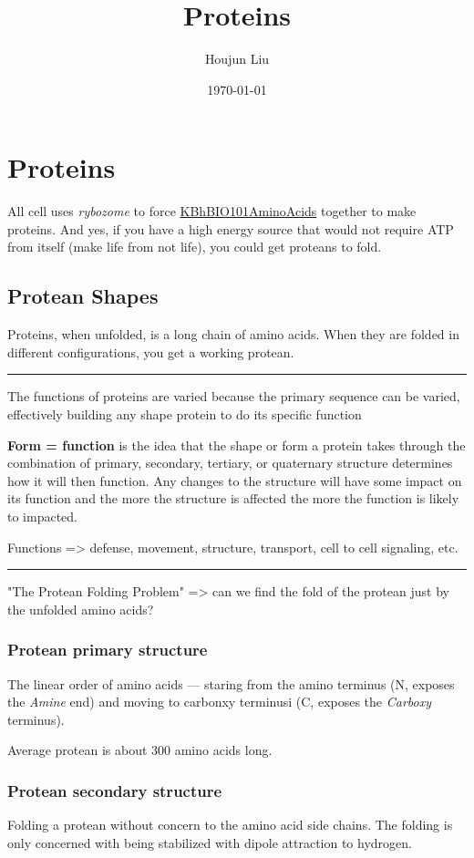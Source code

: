 \documentclass[letterpaper]{article}
\author{Houjun Liu}
\date{\today}
\title{Proteins}
\renewcommand{\tableofcontents}{}
\begin{document}
\tableofcontents



\section{Proteins}
\label{sec:orgbb09798}
All cell uses \emph{rybozome} to force
\href{KBhBIO101AminoAcids.org}{KBhBIO101AminoAcids} together to make
proteins. And yes, if you have a high energy source that would not
require ATP from itself (make life from not life), you could get
proteans to fold.

\subsection{Protean Shapes}
\label{sec:org11996e3}
Proteins, when unfolded, is a long chain of amino acids. When they are
folded in different configurations, you get a working protean.

\noindent\rule{\textwidth}{0.5pt}

The functions of proteins are varied because the primary sequence can be
varied, effectively building any shape protein to do its specific
function

\textbf{Form = function} is the idea that the shape or form a protein takes
through the combination of primary, secondary, tertiary, or quaternary
structure determines how it will then function. Any changes to the
structure will have some impact on its function and the more the
structure is affected the more the function is likely to impacted.

Functions => defense, movement, structure, transport, cell to cell
signaling, etc.

\noindent\rule{\textwidth}{0.5pt}

"The Protean Folding Problem" => can we find the fold of the protean
just by the unfolded amino acids?

\subsubsection{Protean primary structure}
\label{sec:org0fac82a}
The linear order of amino acids --- staring from the amino terminus (N,
exposes the \emph{Amine} end) and moving to carbonxy terminusi (C, exposes
the \emph{Carboxy} terminus).

Average protean is about 300 amino acids long.

\subsubsection{Protean secondary structure}
\label{sec:org665642f}
Folding a protean without concern to the amino acid side chains. The
folding is only concerned with being stabilized with dipole attraction
to hydrogen.
\end{document}
